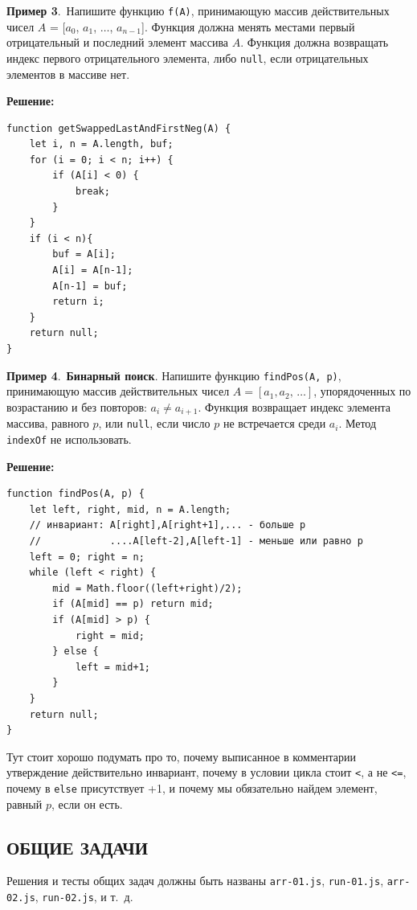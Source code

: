 \documentclass{article}
\begin{document}
{\bf Пример 3}.~Напишите функцию \texttt{f(A)}, принимающую массив действительных чисел $A$ = [$a_0$, $a_1$, $\ldots$, $a_{n-1}$]. Функция должна менять местами первый отрицательный и последний элемент массива $A$. Функция должна возвращать индекс первого отрицательного элемента, либо \texttt{null}, если отрицательных элементов в массиве нет. 

\smallskip\noindent\textbf{Решение:}
\begin{verbatim}
function getSwappedLastAndFirstNeg(A) {
    let i, n = A.length, buf;
    for (i = 0; i < n; i++) {
        if (A[i] < 0) {
            break;
        }
    }
    if (i < n){
        buf = A[i];
        A[i] = A[n-1];
        A[n-1] = buf;
        return i;
    } 
    return null;
}
\end{verbatim}


{\bf Пример 4}.~{\bf Бинарный поиск}. Напишите функцию \texttt{findPos(A, p)}, принимающую массив действительных чисел $A = [a_1, a_2, \, \ldots]$, упорядоченных по возрастанию и без повторов: $a_i \neq a_{i+1}$. Функция возвращает индекс элемента массива, равного $p$, или \texttt{null}, если число $p$ не встречается среди $a_i$. Метод \texttt{indexOf} не использовать.

\pagebreak[4]
\noindent
\medskip\noindent\textbf{Решение:}
\begin{verbatim}
function findPos(A, p) {
    let left, right, mid, n = A.length;
    // инвариант: A[right],A[right+1],... - больше p
    //            ....A[left-2],A[left-1] - меньше или равно p
    left = 0; right = n;
    while (left < right) {
        mid = Math.floor((left+right)/2);
        if (A[mid] == p) return mid;
        if (A[mid] > p) {
            right = mid;
        } else {
            left = mid+1;
        }
    }
    return null;
}
\end{verbatim}
Тут стоит хорошо подумать про то, почему выписанное в комментарии утверждение действительно инвариант, почему в условии цикла стоит \texttt{<}, а не \texttt{<=},
почему в \texttt{else} присутствует +1, и почему мы обязательно найдем элемент, равный $p$, если он есть. 

\newpage

\subsection*{ОБЩИЕ ЗАДАЧИ}
\def\twodigit#1{%
\ifnum#1<10 0\fi 
\number#1}

Решения и тесты общих задач должны быть названы \texttt{arr-01.js}, \texttt{run-01.js}, \texttt{arr-02.js}, \texttt{run-02.js}, и т.~д.
\end{document}
